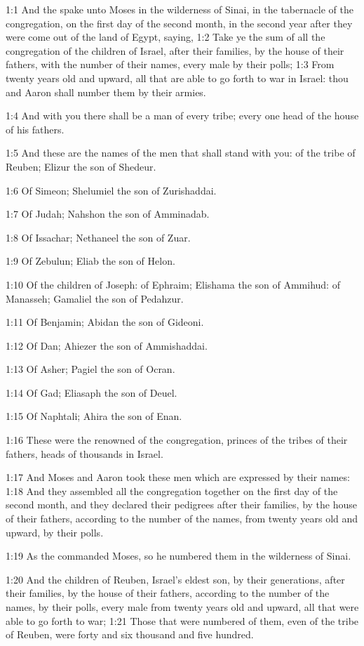 

1:1 And the \LORD spake unto Moses in the wilderness of Sinai, in the tabernacle of the congregation, on the first day of the second month, in the second year after they were come out of the land of Egypt, saying, 1:2 Take ye the sum of all the congregation of the children of Israel, after their families, by the house of their fathers, with the number of their names, every male by their polls; 1:3 From twenty years old and upward, all that are able to go forth to war in Israel: thou and Aaron shall number them by their armies.

1:4 And with you there shall be a man of every tribe; every one head of the house of his fathers.

1:5 And these are the names of the men that shall stand with you: of the tribe of Reuben; Elizur the son of Shedeur.

1:6 Of Simeon; Shelumiel the son of Zurishaddai.

1:7 Of Judah; Nahshon the son of Amminadab.

1:8 Of Issachar; Nethaneel the son of Zuar.

1:9 Of Zebulun; Eliab the son of Helon.

1:10 Of the children of Joseph: of Ephraim; Elishama the son of Ammihud: of Manasseh; Gamaliel the son of Pedahzur.

1:11 Of Benjamin; Abidan the son of Gideoni.

1:12 Of Dan; Ahiezer the son of Ammishaddai.

1:13 Of Asher; Pagiel the son of Ocran.

1:14 Of Gad; Eliasaph the son of Deuel.

1:15 Of Naphtali; Ahira the son of Enan.

1:16 These were the renowned of the congregation, princes of the tribes of their fathers, heads of thousands in Israel.

1:17 And Moses and Aaron took these men which are expressed by their names: 1:18 And they assembled all the congregation together on the first day of the second month, and they declared their pedigrees after their families, by the house of their fathers, according to the number of the names, from twenty years old and upward, by their polls.

1:19 As the \LORD commanded Moses, so he numbered them in the wilderness of Sinai.

1:20 And the children of Reuben, Israel's eldest son, by their generations, after their families, by the house of their fathers, according to the number of the names, by their polls, every male from twenty years old and upward, all that were able to go forth to war; 1:21 Those that were numbered of them, even of the tribe of Reuben, were forty and six thousand and five hundred.

